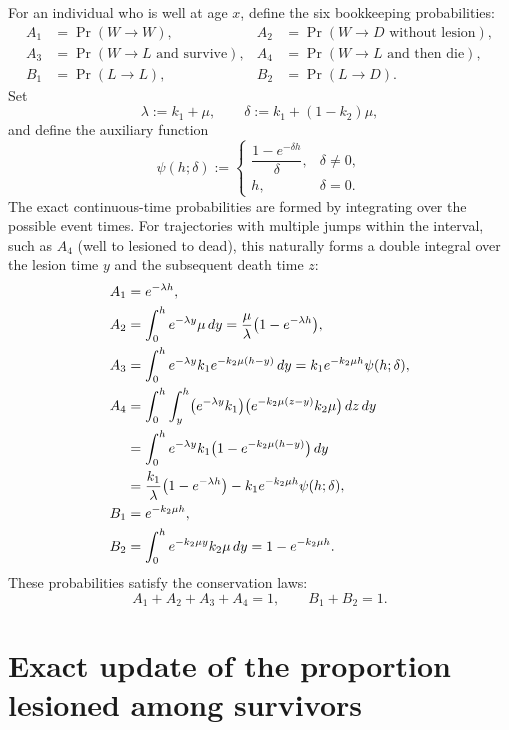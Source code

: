 \documentclass{article}
\begin{document}
For an individual who is well at age \(x\), define the six bookkeeping probabilities:
\begin{align*}
A_1 &= \Pr(W\to W), &
A_2 &= \Pr(W\to D \text{ without lesion}), \\
A_3 &= \Pr(W\to L \text{ and survive}), &
A_4 &= \Pr(W\to L \text{ and then die}), \\
B_1 &= \Pr(L\to L), &
B_2 &= \Pr(L\to D).
\end{align*}
Set
\[
\lambda := k_1+\mu,\qquad
\delta := k_1+(1-k_2)\mu,
\]
and define the auxiliary function
\[
\psi(h;\delta):=
\begin{cases}
\dfrac{1-e^{-\delta h}}{\delta}, & \delta\neq 0,\\[1em]
h, & \delta=0.
\end{cases}
\]
The exact continuous-time probabilities are formed by integrating over the possible event times. For trajectories with multiple jumps within the interval, such as \(A_4\) (well to lesioned to dead), this naturally forms a double integral over the lesion time \(y\) and the subsequent death time \(z\):
\begin{align}
A_1 &= e^{-\lambda h}, \label{eq:A1_exact}\\
A_2 &= \int_0^h e^{-\lambda y}\mu\,dy
    = \frac{\mu}{\lambda}\bigl(1-e^{-\lambda h}\bigr), \label{eq:A2_exact}\\
A_3 &= \int_0^h e^{-\lambda y}k_1 e^{-k_2\mu(h-y)}\,dy
    = k_1 e^{-k_2\mu h}\psi(h;\delta), \label{eq:A3_exact}\\
A_4 &= \int_0^h \int_y^h \bigl(e^{-\lambda y}k_1\bigr) \bigl(e^{-k_2\mu(z-y)}k_2\mu\bigr)\,dz\,dy \notag \\
    &= \int_0^h e^{-\lambda y}k_1\bigl(1-e^{-k_2\mu(h-y)}\bigr)\,dy \notag \\
    &= \frac{k_1}{\lambda}\bigl(1-e^{-\lambda h}\bigr)
      - k_1 e^{-k_2\mu h}\psi(h;\delta), \label{eq:A4_exact}\\
B_1 &= e^{-k_2\mu h}, \label{eq:B1_exact}\\
B_2 &= \int_0^h e^{-k_2\mu y}k_2\mu\,dy = 1-e^{-k_2\mu h}. \label{eq:B2_exact}
\end{align}
These probabilities satisfy the conservation laws:
\[
A_1+A_2+A_3+A_4=1,\qquad
B_1+B_2=1.
\]

\section*{Exact update of the proportion lesioned among survivors}
\end{document}
